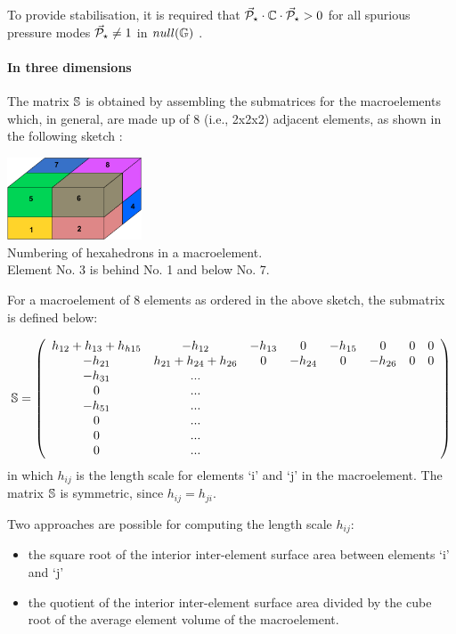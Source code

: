 To provide stabilisation, it is required that
$\vec{\cal P}_\star \cdot {\mathbb{C}} \cdot \vec{\cal P}_\star > 0$ for all
spurious pressure modes $\vec{\cal P}_\star \neq 1$ in $null({\mathbb{G}})$ \cite[p239]{elsw}.


\paragraph{In three dimensions}


The matrix ${\mathbb{S}}$ is obtained by assembling the submatrices 
for the macroelements which, in general, are made up of 8 (i.e., 2x2x2) 
adjacent elements, as shown in the following sketch \cite{chsu97}:

\begin{center}
\includegraphics[width=4cm]{images/q1p0stab/macro3D}\\
{\captionfont Numbering of hexahedrons in a macroelement.\\ 
Element No. 3 is behind No. 1 and below No. 7.} 
\end{center}

For a macroelement of 8 elements as ordered in the above sketch, the submatrix is defined below:

\[
{\mathbb{S}}=
\left(
\begin{array}{cccccccc}
h_{12}+h_{13}+h_{h15} & -h_{12} & -h_{13} &  0  &  -h_{15} & 0  & 0 & 0 \\
-h_{21} & h_{21}+h_{24} + h_{26} & 0 & -h_{24} & 0 & -h_{26} & 0 & 0 \\
-h_{31} & ... \\
0 & ... \\
-h_{51} & ...\\
0 & ...\\
0 & ...\\
0 & ...
\end{array}
\right)
\]
in which $h_{ij}$ is the length scale for elements ‘i’ and ‘j’ in the macroelement. 
The matrix ${\mathbb{S}}$ is symmetric, since $h_{ij}=h_{ji}$. 

Two approaches are possible  for computing the length scale $h_{ij}$:
\begin{itemize}
\item the square root of the interior inter-element surface area between elements ‘i’ and ‘j’
\item the quotient of the interior inter-element surface area divided by the cube 
root of the average element volume of the macroelement.
\end{itemize}


